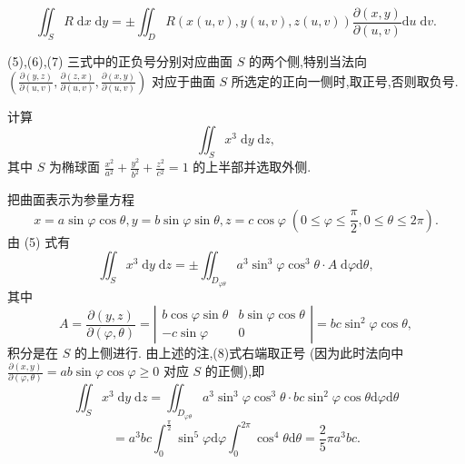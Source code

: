 \[
{\iint }_{S}R\mathrm{\;d}x\mathrm{\;d}y =  \pm  {\iint }_{D}R\left( {x\left( {u,v}\right) ,y\left( {u,v}\right) ,z\left( {u,v}\right) }\right) \frac{\partial \left( {x,y}\right) }{\partial \left( {u,v}\right) }\mathrm{d}u\mathrm{\;d}v. \tag{7}
\]
\begin{remark}

\end{remark}
(5),(6),(7) 三式中的正负号分别对应曲面 \(S\) 的两个侧,特别当法向 \(\left( {\frac{\partial \left( {y,z}\right) }{\partial \left( {u,v}\right) },\frac{\partial \left( {z,x}\right) }{\partial \left( {u,v}\right) },\frac{\partial \left( {x,y}\right) }{\partial \left( {u,v}\right) }}\right)\) 对应于曲面 \(S\) 所选定的正向一侧时,取正号,否则取负号.

\begin{example}

\end{example}
计算
\[
{\iint }_{S}{x}^{3}\mathrm{\;d}y\mathrm{\;d}z,
\]
其中 \(S\) 为椭球面 \(\frac{{x}^{2}}{{a}^{2}} + \frac{{y}^{2}}{{b}^{2}} + \frac{{z}^{2}}{{c}^{2}} = 1\) 的上半部并选取外侧.

\begin{solution}

\end{solution}
把曲面表示为参量方程
\[
x = a\sin \varphi \cos \theta ,y = b\sin \varphi \sin \theta ,z = c\cos \varphi \;\left( {0 \leq  \varphi  \leq  \frac{\pi }{2},0 \leq  \theta  \leq  {2\pi }}\right) .
\]
由 (5) 式有
\[
{\iint }_{S}{x}^{3}\mathrm{\;d}y\mathrm{\;d}z =  \pm  {\iint }_{{D}_{\varphi \theta }}{a}^{3}{\sin }^{3}\varphi {\cos }^{3}\theta  \cdot  A\mathrm{\;d}\varphi \mathrm{d}\theta , \tag{8}
\]
其中
\[
A = \frac{\partial \left( {y,z}\right) }{\partial \left( {\varphi ,\theta }\right) } = \left| \begin{matrix} b\cos \varphi \sin \theta & b\sin \varphi \cos \theta \\   - c\sin \varphi & 0 \end{matrix}\right|  = {bc}{\sin }^{2}\varphi \cos \theta ,
\]
积分是在 \(S\) 的上侧进行. 由上述的注,(8)式右端取正号 (因为此时法向中 \(\frac{\partial \left( {x,y}\right) }{\partial \left( {\varphi ,\theta }\right) } = {ab}\sin \varphi \cos \varphi  \geq  0\) 对应 \(S\) 的正侧),即
\[
{\iint }_{S}{x}^{3}\mathrm{\;d}y\mathrm{\;d}z = {\iint }_{{D}_{\varphi \theta }}{a}^{3}{\sin }^{3}\varphi {\cos }^{3}\theta  \cdot  {bc}{\sin }^{2}\varphi \cos \theta \mathrm{d}\varphi \mathrm{d}\theta
\]
\[
= {a}^{3}{bc}{\int }_{0}^{\frac{\pi }{2}}{\sin }^{5}\varphi \mathrm{d}\varphi {\int }_{0}^{2\pi }{\cos }^{4}\theta \mathrm{d}\theta  = \frac{2}{5}\pi {a}^{3}{bc}.
\]
